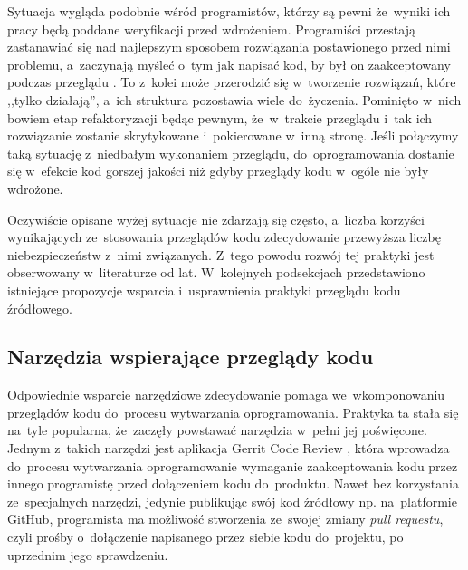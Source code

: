 \documentclass[twoside]{praca}
\begin{document}
Sytuacja wygląda podobnie wśród programistów, którzy są pewni że~wyniki ich pracy będą poddane weryfikacji przed wdrożeniem. Programiści przestają zastanawiać się nad najlepszym sposobem rozwiązania postawionego przed nimi problemu, a~zaczynają myśleć o~tym jak napisać kod, by był on zaakceptowany podczas przeglądu \cite{baysal2013influence}. To z~kolei może przerodzić się w~tworzenie rozwiązań, które ,,tylko działają'', a~ich struktura pozostawia wiele do~życzenia. Pominięto w~nich bowiem etap refaktoryzacji będąc pewnym, że~w~trakcie przeglądu i~tak ich rozwiązanie zostanie skrytykowane i~pokierowane w~inną stronę. Jeśli połączymy taką sytuację z~niedbałym wykonaniem przeglądu, do~oprogramowania dostanie się w~efekcie kod gorszej jakości niż gdyby przeglądy kodu w~ogóle nie były wdrożone.

Oczywiście opisane wyżej sytuacje nie zdarzają się często, a~liczba korzyści wynikających ze~stosowania przeglądów kodu zdecydowanie przewyższa liczbę niebezpieczeństw z~nimi związanych. Z~tego powodu rozwój tej praktyki jest obserwowany w~literaturze od lat. W~kolejnych podsekcjach przedstawiono istniejące propozycje wsparcia i~usprawnienia praktyki przeglądu kodu źródłowego.

\subsection{Narzędzia wspierające przeglądy kodu}


Odpowiednie wsparcie narzędziowe zdecydowanie pomaga we~wkomponowaniu przeglądów kodu do~procesu wytwarzania oprogramowania. Praktyka ta stała się na~tyle popularna, że~zaczęły powstawać narzędzia w~pełni jej poświęcone. Jednym z~takich narzędzi jest aplikacja Gerrit Code Review \cite{Milanesio2013}, która wprowadza do~procesu wytwarzania oprogramowanie wymaganie zaakceptowania kodu przez innego programistę przed dołączeniem kodu do~produktu. Nawet bez korzystania ze~specjalnych narzędzi, jedynie publikując swój kod źródłowy np. na~platformie GitHub, programista ma możliwość stworzenia ze~swojej zmiany \textit{pull requestu}, czyli prośby o~dołączenie napisanego przez siebie kodu do~projektu, po uprzednim jego sprawdzeniu.
\end{document}
